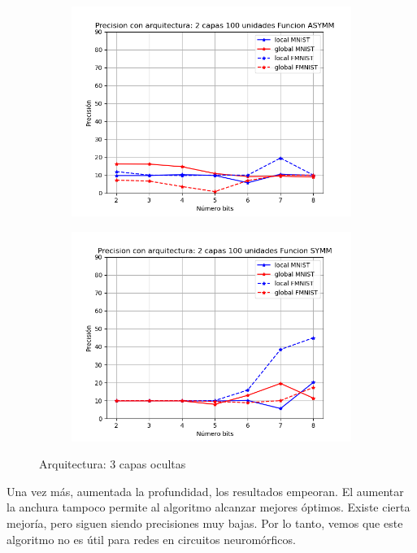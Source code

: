 \begin{figure}[H]
\begin{subfigure}[H]{0.475\textwidth}
    \end{subfigure}
    \begin{subfigure}[H]{0.475\textwidth}
    \includegraphics[width=\textwidth]{imagenes/dni/Precision con arquitectura: 2 capas 100 unidades Funcion ASYMM.png}
    \end{subfigure}
    \begin{subfigure}[H]{0.475\textwidth}
    \includegraphics[width=\textwidth]{imagenes/dni/Precision con arquitectura: 2 capas 100 unidades Funcion SYMM.png}
    \end{subfigure}
    \caption{Arquitectura: 3 capas ocultas}
\end{figure}

Una vez más, aumentada la profundidad, los resultados empeoran. El aumentar la anchura tampoco permite al algoritmo alcanzar mejores óptimos. Existe cierta mejoría, pero siguen siendo precisiones muy bajas. Por lo tanto, vemos que este algoritmo no es útil para redes en circuitos neuromórficos.